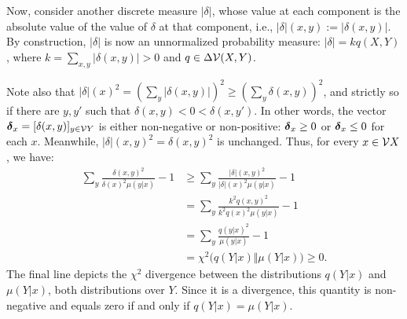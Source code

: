 \begin{lproof}
    Now, consider another discrete measure $|\delta|$, whose value at each component is the absolute value of the value of $\delta$ at that component, i.e., $|\delta|(x,y) := |\delta(x,y)|$.
    By construction, $|\delta|$ is now an unnormalized probability measure: $|\delta| = k q(X,Y)$, where $k = \sum_{x,y}|\delta(x,y)| > 0$ and $q \in \Delta\mathcal V(X,Y)$. 

    Note also that $|\delta|(x)^2 = (\sum_{y} |\delta(x,y)|)^2 \ge (\sum_{y} \delta(x,y))^2$, and strictly so if there are $y,y'$ such that $\delta(x,y) < 0 < \delta(x,y')$.
    In other words, the vector ${\boldsymbol\delta}_x = [\delta(x,y)]_{y \in \mathcal V Y}$ is either non-negative or non-positive: ${\boldsymbol\delta}_x \ge 0$ or ${\boldsymbol\delta}_x \le 0$ for each $x$. 
     Meanwhile, $|\delta|(x,y)^2 = \delta(x,y)^2$ is unchanged.
    Thus, for every $x \in \mathcal V X$, we have:
    \begin{align*}
        \sum_y \frac{\delta(x,y)^2}{\delta(x)^2 \mu(y|x)} - 1
        &\ge \sum_y \frac{|\delta|(x,y)^2}{|\delta|(x)^2 \mu(y|x)} - 1 \\
        &= \sum_y \frac{k^2 q(x,y)^2}{k^2 q(x)^2 \mu(y|x)} - 1 \\
        &= \sum_y \frac{ q(y|x)^2}{\mu(y|x)} - 1   \\
        &= \chi^2 \Big( q(Y|x) \Big\Vert  \mu(Y|x) \Big) \ge 0.
    \end{align*}
    The final line depicts the $\chi^2$ divergence between the distributions $q(Y|x)$ and $\mu(Y|x)$, both distributions over $Y$.  Since it is a divergence, this quantity is non-negative and equals zero if and only if $q(Y|x)=\mu(Y|x)$.
    

\end{lproof}
